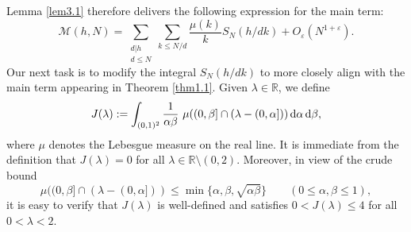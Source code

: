 \documentclass[12pt,reqno]{amsart}
\theoremstyle{definition}
\theoremstyle{remark}
\numberwithin{equation}{section}
\def\eps{\varepsilon}
\def \cM {\mathcal M}
\def \R {\mathbb{R}}
\def\d{{\,{\rm d}}}
\newcommand\1{\mathds{1}}
\begin{document}
Lemma \ref{lem3.1} therefore delivers the following expression for the main term:
\begin{equation}\label{eqn3.6}
    \cM(h,N)= \sum_{\substack{d|h \\ d \leqslant N}} \sum_{k\leqslant N/d}\frac{\mu(k)}{k}S_N(h/dk) + O_\eps(N^{1+\eps}).
\end{equation}
Our next task is to modify the integral $S_N(h/dk)$ to more closely align with the main term appearing in Theorem \ref{thm1.1}. Given $\lambda\in\R$, we define
\begin{equation}\label{eqn3.7}
     J(\lambda):=\int_{(0,1)^2} \frac{1}{\alpha \beta} \ \mu( (0, \beta] \cap (\lambda - (0, \alpha]  ) )\d \alpha \d \beta,
\end{equation}
where $\mu$ denotes the Lebesgue measure on the real line. It is immediate from the definition that $J(\lambda)=0$ for all $\lambda\in\R\setminus(0,2)$. Moreover, in view of the crude bound
    \begin{equation}\label{eqn3.8}
        \mu( (0, \beta] \cap (\lambda - (0, \alpha]  ) ) \leqslant\min\{\alpha,\beta,\sqrt{\alpha\beta}\} \qquad(0\leqslant\alpha,\beta\leqslant 1),
    \end{equation}
it is easy to verify that $J(\lambda)$ is well-defined and satisfies $0< J(\lambda)\leqslant 4$ for all $0<\lambda< 2$.
\end{document}
